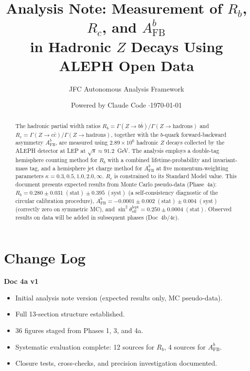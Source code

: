\documentclass[11pt,a4paper]{article}
\title{Analysis Note: Measurement of $R_b$, $R_c$, and $A_\mathrm{FB}^b$\\
in Hadronic $Z$ Decays Using ALEPH Open Data}
\author{JFC Autonomous Analysis Framework}
\date{Powered by Claude Code \quad$\cdot$\quad \today}
\begin{document}
\maketitle

\begin{abstract}
The hadronic partial width ratios $R_b = \Gamma(Z \to b\bar{b})/\Gamma(Z \to \mathrm{hadrons})$
and $R_c = \Gamma(Z \to c\bar{c})/\Gamma(Z \to \mathrm{hadrons})$, together with the
$b$-quark forward-backward asymmetry $A_\mathrm{FB}^b$, are measured using $2.89 \times 10^6$
hadronic $Z$ decays collected by the ALEPH detector at LEP at $\sqrt{s} \approx 91.2$~GeV.
The analysis employs a double-tag hemisphere counting method for $R_b$ with a combined
lifetime-probability and invariant-mass tag, and a hemisphere jet charge method for
$A_\mathrm{FB}^b$ at five momentum-weighting parameters $\kappa = 0.3, 0.5, 1.0, 2.0, \infty$.
$R_c$ is constrained to its Standard Model value.
This document presents expected results from Monte Carlo pseudo-data (Phase~4a):
$R_b = 0.280 \pm 0.031\;\mathrm{(stat)} \pm 0.395\;\mathrm{(syst)}$
(a self-consistency diagnostic of the circular calibration procedure),
$A_\mathrm{FB}^b = -0.0001 \pm 0.002\;\mathrm{(stat)} \pm 0.004\;\mathrm{(syst)}$
(correctly zero on symmetric MC), and
$\sin^2\theta_\mathrm{eff}^\mathrm{lept} = 0.250 \pm 0.0004\;\mathrm{(stat)}$.
Observed results on data will be added in subsequent phases (Doc~4b/4c).
\end{abstract}

\tableofcontents
\clearpage

\section*{Change Log}

\textbf{Doc 4a v1}
\begin{itemize}
\item Initial analysis note version (expected results only, MC pseudo-data).
\item Full 13-section structure established.
\item 36 figures staged from Phases 1, 3, and 4a.
\item Systematic evaluation complete: 12 sources for $R_b$, 4 sources for $A_\mathrm{FB}^b$.
\item Closure tests, cross-checks, and precision investigation documented.
\end{itemize}
\end{document}
